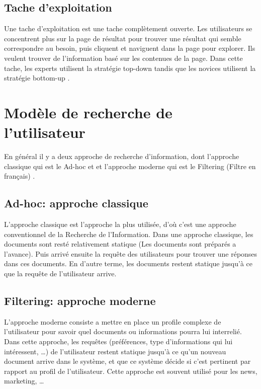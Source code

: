 \subsection{Tache d'exploitation}
Une tache d'exploitation est une tache complètement ouverte. Les utilisateurs se concentrent plus sur la page de résultat pour trouver une résultat qui semble correspondre au besoin, puis cliquent et naviguent dans la page pour explorer. Ils veulent trouver de l'information basé sur les contenues de la page. Dans cette tache, les experts utilisent la stratégie top-down tandis que les novices utilisent la stratégie bottom-up \citep{ri-sur-le-web}.

\section{Modèle de recherche de l'utilisateur}
En général il y a deux approche de recherche d'information, dont l'approche classique qui est le Ad-hoc et et l'approche moderne qui est le Filtering (Filtre en français) \citep{modern-ir}.

\subsection{Ad-hoc: approche classique}
L'approche classique est l'approche la plus utilisée, d'où c'est une approche conventionnel de la Recherche de l'Information. Dans une approche classique, les documents sont resté relativement statique (Les documents sont préparés a l'avance). Puis arrivé ensuite la requête des utilisateurs pour trouver une réponses dans ces documents. En d'autre terme, les documents restent statique jusqu’à ce que la requête de l'utilisateur arrive.

\subsection{Filtering: approche moderne}
L'approche moderne consiste a mettre en place un profile complexe de l'utilisateur pour savoir quel documents ou informations pourra lui interrelié. Dans cette approche, les requêtes (préférences, type d'informations qui lui intéressent, \dots) de l'utilisateur restent statique jusqu’à ce qu'un nouveau document arrive dans le système, et que ce système décide si c'est pertinent par rapport au profil de l'utilisateur. Cette approche est souvent utilisé pour les news, marketing, \dots

